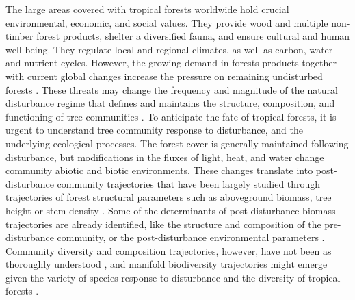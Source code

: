 \documentclass[fleqn,10pt]{ArtEcoFoG} %
\begin{document}
The large areas covered with tropical forests worldwide hold crucial environmental, economic, and social values.
They provide wood and multiple non-timber forest products, shelter a diversified fauna, and ensure cultural and human well-being.
They regulate local and regional climates, as well as carbon, water and nutrient cycles.
However, the growing demand in forests products together with current global changes increase the pressure on remaining undisturbed forests \citep{Morales-Hidalgo2015}.
\color{red}These threats may change the frequency and magnitude of the natural disturbance regime that defines and maintains the structure, composition, and functioning of tree communities \citep{Schnitzer2001, Anderson-Teixeira2013, Sist2015}. \color{black}
To anticipate the fate of tropical forests, it is urgent to understand tree community response to disturbance, and the underlying ecological processes.
The forest cover is generally maintained following disturbance, but modifications in the fluxes of light, heat, and water \citep{Goulamoussene2017} change community abiotic and biotic environments.
These changes translate into post-disturbance community trajectories that have been largely studied through trajectories of forest structural parameters such as aboveground biomass, tree height or stem density \citep{Piponiot2016, Rutishauser2016}.
Some of the determinants of post-disturbance biomass trajectories are already identified, like the structure and composition of the pre-disturbance community, or the post-disturbance environmental parameters \citep{Herault2018}.
Community diversity and composition trajectories, however, have not been as thoroughly understood \citep{Guitet2018, Molino2001}, and manifold biodiversity trajectories might emerge given the variety of species response to disturbance and the diversity of tropical forests \citep{Lindenmayer2012, Garcia_florez2017}.
\end{document}
